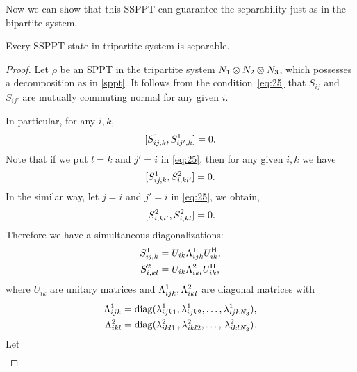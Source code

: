 Now we can show that this SSPPT can guarantee the separability just as in the bipartite system. 
\begin{thm}
     Every  SSPPT state in tripartite system  is separable.
   \end{thm}
   \begin{proof}
     Let $\rho$ be an SPPT in the tripartite system $N_1\otimes N_2 \linebreak\otimes N_3$, which possesses a decomposition as in \cref{sppt}.
     It follows from the condition~\eqref{eq:25} that  $S_{ij}$ and $S_{ij'}$ are mutually commuting normal for any given $i$.

     In particular,  for any $i,k$,
     \begin{equation}
       \label{eq:26}
       [S^1_{ij,k} , S^1_{ij',k}]=0.
     \end{equation}
     Note that if we put  $l=k$ and $j'=i$ in \cref{eq:25}, then for any given $i,k$ we have
     \begin{equation}
       \label{eq:27}
       [S^1_{ij,k}, S^2_{i,kl'}]=0.
     \end{equation}
     In the similar way, let $j=i$ and $j'=i$  in \cref{eq:25},  we obtain,
     \begin{equation}
       \label{eq:28}
       [S^2_{i,kl'} , S^2_{i,kl}]=0.
     \end{equation}
     Therefore we have a simultaneous diagonalizations:
     \begin{equation}
       \label{eq:29}
       \begin{split}
         S^1_{ij,k}& = U_{ik} \Lambda^{1}_{ijk }U^{\mathsf{H}}_{ik},\\
         S^2_{i,kl}& = U_{ik} \Lambda^{2}_{ikl} U^{\mathsf{H}}_{ik},
       \end{split}
     \end{equation}
     where $U_{ik}$ are unitary matrices and $\Lambda^{1}_{ijk },\Lambda^{2}_{ikl}$ are diagonal matrices with
     \begin{equation*}
       \begin{split}
         \Lambda^{1}_{ijk } & = \mathrm{diag} ( \lambda^{1}_{ijk 1},\lambda^{1}_{ijk 2},\ldots,\lambda^{1}_{ijk N_3}),\\
         \Lambda^{2}_{ikl} & = \mathrm{diag} ( \lambda^{2}_{ikl 1}\,,\lambda^{2}_{ikl 2},\ldots,\,\lambda^{2}_{ikl N_3}).
       \end{split}
     \end{equation*}
     Let
     \begin{equation}
       \label{eq:30}
       \begin{split}

\end{split}
\end{equation}
\end{proof}
